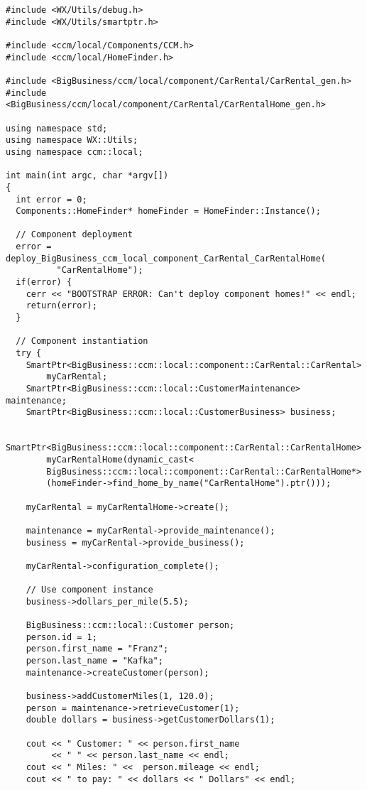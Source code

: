 \begin{small}
\begin{verbatim}
#include <WX/Utils/debug.h>
#include <WX/Utils/smartptr.h>

#include <ccm/local/Components/CCM.h>
#include <ccm/local/HomeFinder.h>

#include <BigBusiness/ccm/local/component/CarRental/CarRental_gen.h>
#include <BigBusiness/ccm/local/component/CarRental/CarRentalHome_gen.h>

using namespace std;
using namespace WX::Utils;
using namespace ccm::local;

int main(int argc, char *argv[])
{
  int error = 0;
  Components::HomeFinder* homeFinder = HomeFinder::Instance();

  // Component deployment
  error = deploy_BigBusiness_ccm_local_component_CarRental_CarRentalHome(
          "CarRentalHome");
  if(error) {
    cerr << "BOOTSTRAP ERROR: Can't deploy component homes!" << endl;
    return(error);
  }

  // Component instantiation
  try {
    SmartPtr<BigBusiness::ccm::local::component::CarRental::CarRental> 
        myCarRental;
    SmartPtr<BigBusiness::ccm::local::CustomerMaintenance> maintenance;
    SmartPtr<BigBusiness::ccm::local::CustomerBusiness> business;

    SmartPtr<BigBusiness::ccm::local::component::CarRental::CarRentalHome>
        myCarRentalHome(dynamic_cast<
        BigBusiness::ccm::local::component::CarRental::CarRentalHome*>
        (homeFinder->find_home_by_name("CarRentalHome").ptr()));

    myCarRental = myCarRentalHome->create();

    maintenance = myCarRental->provide_maintenance();    
    business = myCarRental->provide_business();

    myCarRental->configuration_complete();

    // Use component instance
    business->dollars_per_mile(5.5);

    BigBusiness::ccm::local::Customer person;
    person.id = 1;
    person.first_name = "Franz";
    person.last_name = "Kafka";
    maintenance->createCustomer(person);

    business->addCustomerMiles(1, 120.0); 
    person = maintenance->retrieveCustomer(1);
    double dollars = business->getCustomerDollars(1); 

    cout << " Customer: " << person.first_name 
         << " " << person.last_name << endl;
    cout << " Miles: " <<  person.mileage << endl;
    cout << " to pay: " << dollars << " Dollars" << endl;


\end{verbatim}
\end{small}
